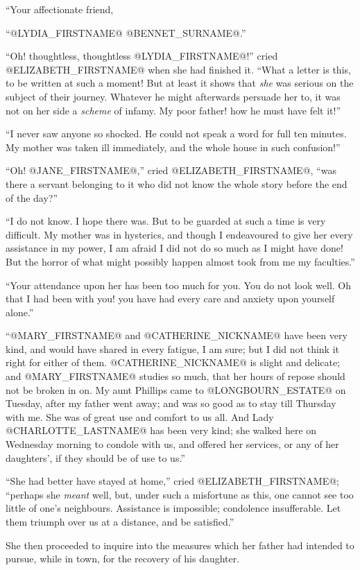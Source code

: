 ``Your affectionate friend,

``@LYDIA_FIRSTNAME@ @BENNET_SURNAME@.''

``Oh! thoughtless, thoughtless @LYDIA_FIRSTNAME@!'' cried @ELIZABETH_FIRSTNAME@ when she had
finished it. ``What a letter is this, to be written at such a moment!
But at least it shows that \textit{she} was serious on the subject of their
journey. Whatever he might afterwards persuade her to, it was not on her
side a \textit{scheme} of infamy. My poor father! how he must have felt it!''

``I never saw anyone so shocked. He could not speak a word for full ten
minutes. My mother was taken ill immediately, and the whole house in
such confusion!''

``Oh! @JANE_FIRSTNAME@,'' cried @ELIZABETH_FIRSTNAME@, ``was there a servant belonging to it who
did not know the whole story before the end of the day?''

``I do not know. I hope there was. But to be guarded at such a time is
very difficult. My mother was in hysterics, and though I endeavoured to
give her every assistance in my power, I am afraid I did not do so
much as I might have done! But the horror of what might possibly happen
almost took from me my faculties.''

``Your attendance upon her has been too much for you. You do not look
well. Oh that I had been with you! you have had every care and anxiety
upon yourself alone.''

``@MARY_FIRSTNAME@ and @CATHERINE_NICKNAME@ have been very kind, and would have shared in every
fatigue, I am sure; but I did not think it right for either of them.
@CATHERINE_NICKNAME@ is slight and delicate; and @MARY_FIRSTNAME@ studies so much, that her hours
of repose should not be broken in on. My aunt Phillips came to @LONGBOURN_ESTATE@
on Tuesday, after my father went away; and was so good as to stay till
Thursday with me. She was of great use and comfort to us all. And
Lady @CHARLOTTE_LASTNAME@ has been very kind; she walked here on Wednesday morning to
condole with us, and offered her services, or any of her daughters', if
they should be of use to us.''

``She had better have stayed at home,'' cried @ELIZABETH_FIRSTNAME@; ``perhaps she
\textit{meant} well, but, under such a misfortune as this, one cannot see
too little of one's neighbours. Assistance is impossible; condolence
insufferable. Let them triumph over us at a distance, and be satisfied.''

She then proceeded to inquire into the measures which her father had
intended to pursue, while in town, for the recovery of his daughter.


